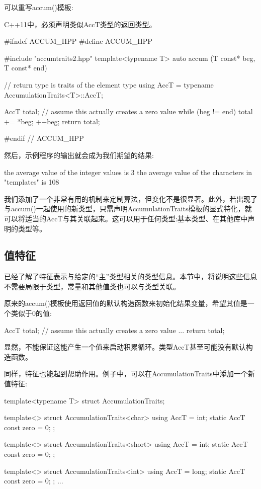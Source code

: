 可以重写accum()模板:

\begin{notice}C++11中，必须声明类似AccT类型的返回类型。
\end{notice}

\begin{cpp}
#ifndef ACCUM_HPP
#define ACCUM_HPP

#include "accumtraits2.hpp"
template<typename T>
auto accum (T const* beg, T const* end)
{
	// return type is traits of the element type
	using AccT = typename AccumulationTraits<T>::AccT;
	
	AccT total{}; // assume this actually creates a zero value
	while (beg != end) {
		total += *beg;
		++beg;
	}
	return total;
}

#endif // ACCUM_HPP
\end{cpp}

然后，示例程序的输出就会成为我们期望的结果:

\begin{shell}
the average value of the integer values is 3
the average value of the characters in "templates" is 108
\end{shell}

我们添加了一个非常有用的机制来定制算法，但变化不是很显著。此外，若出现了与accum()一起使用的新类型，只需声明AccumulationTraits模板的显式特化，就可以将适当的AccT与其关联起来。这可以用于任何类型:基本类型、在其他库中声明的类型等。

\subsection{值特征}

已经了解了特征表示与给定的“主”类型相关的类型信息。本节中，将说明这些信息不需要局限于类型，常量和其他值类也可以与类型关联。

原来的accum()模板使用返回值的默认构造函数来初始化结果变量，希望其值是一个类似于0的值:

\begin{cpp}
AccT total{}; // assume this actually creates a zero value
...
return total;
\end{cpp}

显然，不能保证这能产生一个值来启动积累循环。类型AccT甚至可能没有默认构造函数。

同样，特征也能起到帮助作用。例子中，可以在AccumulationTraits中添加一个新值特征:

\begin{cpp}
template<typename T>
struct AccumulationTraits;

template<>
struct AccumulationTraits<char> {
	using AccT = int;
	static AccT const zero = 0;
};

template<>
struct AccumulationTraits<short> {
	using AccT = int;
	static AccT const zero = 0;
};

template<>
struct AccumulationTraits<int> {
	using AccT = long;
	static AccT const zero = 0;
};
...
\end{cpp}

